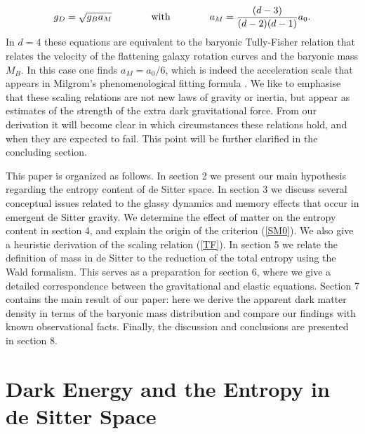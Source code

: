 \documentclass[a4paper,12pt]{article}
\begin{document}
\begin{equation}
g_{D} = \sqrt{g_{B} a_M} \qquad \qquad \mbox{with}  \qquad \qquad  a_M = {(d-3) \over (d-2)(d-1)} a_0.	
\end{equation}
In $d=4$ these equations are equivalent to the baryonic Tully-Fisher relation \cite{TF-relation} that relates the velocity of the flattening galaxy rotation curves and the baryonic mass $M_B$.  In this case one finds $a_M = a_0/6$, which is indeed the acceleration scale that appears in Milgrom's phenomenological fitting formula \cite{Milgrom,Sanders}.  We like to emphasise that these scaling relations are not  new laws of gravity or inertia, but appear as estimates of the strength of the extra dark gravitational force. From our derivation it will become clear in which circumstances these relations hold, and when they are expected to fail. This point will be further clarified in the concluding section.

This paper is organized as follows. In section 2 we present our main hypothesis regarding the entropy content of de Sitter space. In section 3 we discuss several conceptual issues related to the glassy dynamics and memory effects that occur in emergent de Sitter gravity.  We determine the effect of matter on the entropy content in section 4, and explain the origin of the criterion (\ref{SM0}). We also give a heuristic derivation of the scaling relation (\ref{TF}). In section 5 we relate the definition of mass in de Sitter to the reduction of the total entropy using the Wald formalism. This serves as a preparation for section 6, where we give a detailed correspondence between the gravitational and elastic equations. 
Section 7 contains the main result of our paper: here we derive the apparent dark matter density in terms of the baryonic mass distribution and compare our findings with known observational facts.  Finally, the discussion and conclusions are presented in section 8.  



 
 
 


\newpage

\section{Dark Energy and the Entropy in de Sitter Space}

\label{sec:darkenergyandentropy}
\end{document}
